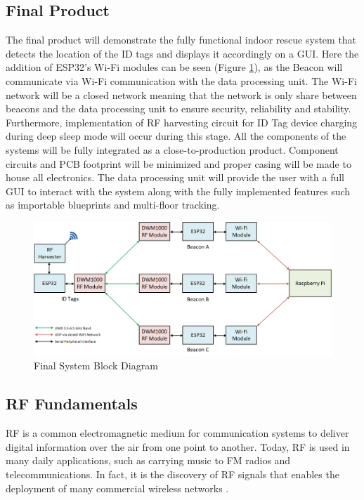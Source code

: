 \subsection{Final Product}
\medskip
The final product will demonstrate the fully functional indoor rescue system that detects the location of the ID tags and displays it accordingly on a GUI. Here the addition of ESP32’s Wi-Fi modules can be seen (Figure \ref{final}), as the Beacon will communicate via Wi-Fi communication with the data processing unit. The Wi-Fi network will be a closed network meaning that the network is only share between beacons and the data processing unit to ensure security, reliability and stability. Furthermore, implementation of RF harvesting circuit for ID Tag device charging during deep sleep mode will occur during this stage. All the components of the systems will be fully integrated as a close-to-production product. Component circuits and PCB footprint will be minimized and proper casing will be made to house all electronics. The data processing unit will provide the user with a full GUI to interact with the system along with the fully implemented features such as importable blueprints and multi-floor tracking.

\medskip
\begin{figure}[H]
\centering
    \includegraphics[width=\linewidth]{./images/03_final.png}
    \caption{Final System Block Diagram}
    \label{final}
\end{figure}


\pagebreak
\subsection{RF Fundamentals}
\medskip
RF is a common electromagnetic medium for communication systems to deliver digital information over the air from one point to another. Today, RF is used in many daily applications, such as carrying music to FM radios and telecommunications. In fact, it is the discovery of RF signals that enables the deployment of many commercial wireless networks \cite{R2-4-1}.

